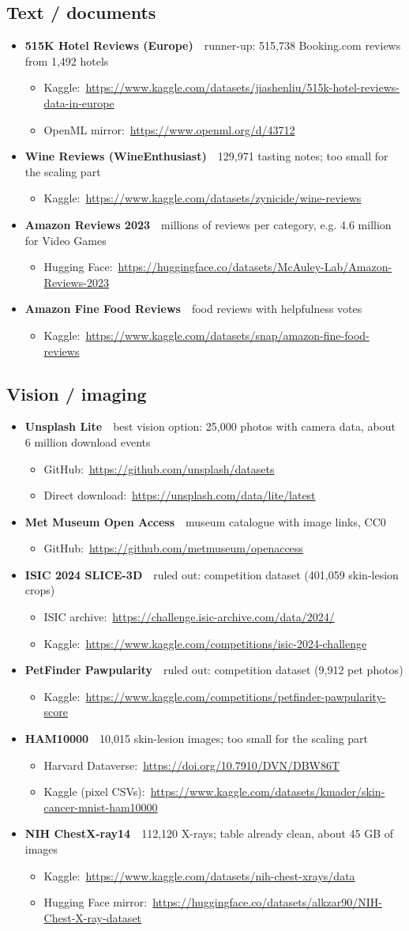 \documentclass[11pt,a4paper]{article}
\newcommand{\data}[3]{\item \textbf{#1}\ \ {\color{muted}#2}\par\nopagebreak
  \begin{itemize}[leftmargin=0.9em, itemsep=1pt, topsep=1pt, label={}]#3\end{itemize}}
\newcommand{\lnk}[2]{\item #1:\ \url{#2}}
\begin{document}
\subsection{Text / documents}
\begin{itemize}
\data{515K Hotel Reviews (Europe)}{runner-up: 515,738 Booking.com reviews from 1,492 hotels}{%
  \lnk{Kaggle}{https://www.kaggle.com/datasets/jiashenliu/515k-hotel-reviews-data-in-europe}%
  \lnk{OpenML mirror}{https://www.openml.org/d/43712}}
\data{Wine Reviews (WineEnthusiast)}{129,971 tasting notes; too small for the scaling part}{%
  \lnk{Kaggle}{https://www.kaggle.com/datasets/zynicide/wine-reviews}}
\data{Amazon Reviews 2023}{millions of reviews per category, e.g. 4.6 million for Video Games}{%
  \lnk{Hugging Face}{https://huggingface.co/datasets/McAuley-Lab/Amazon-Reviews-2023}}
\data{Amazon Fine Food Reviews}{food reviews with helpfulness votes}{%
  \lnk{Kaggle}{https://www.kaggle.com/datasets/snap/amazon-fine-food-reviews}}
\end{itemize}

\subsection{Vision / imaging}
\begin{itemize}
\data{Unsplash Lite}{best vision option: 25,000 photos with camera data, about 6 million download events}{%
  \lnk{GitHub}{https://github.com/unsplash/datasets}%
  \lnk{Direct download}{https://unsplash.com/data/lite/latest}}
\data{Met Museum Open Access}{museum catalogue with image links, CC0}{%
  \lnk{GitHub}{https://github.com/metmuseum/openaccess}}
\data{ISIC 2024 SLICE-3D}{ruled out: competition dataset (401,059 skin-lesion crops)}{%
  \lnk{ISIC archive}{https://challenge.isic-archive.com/data/2024/}%
  \lnk{Kaggle}{https://www.kaggle.com/competitions/isic-2024-challenge}}
\data{PetFinder Pawpularity}{ruled out: competition dataset (9,912 pet photos)}{%
  \lnk{Kaggle}{https://www.kaggle.com/competitions/petfinder-pawpularity-score}}
\data{HAM10000}{10,015 skin-lesion images; too small for the scaling part}{%
  \lnk{Harvard Dataverse}{https://doi.org/10.7910/DVN/DBW86T}%
  \lnk{Kaggle (pixel CSVs)}{https://www.kaggle.com/datasets/kmader/skin-cancer-mnist-ham10000}}
\data{NIH ChestX-ray14}{112,120 X-rays; table already clean, about 45 GB of images}{%
  \lnk{Kaggle}{https://www.kaggle.com/datasets/nih-chest-xrays/data}%
  \lnk{Hugging Face mirror}{https://huggingface.co/datasets/alkzar90/NIH-Chest-X-ray-dataset}}
\end{itemize}
\end{document}
